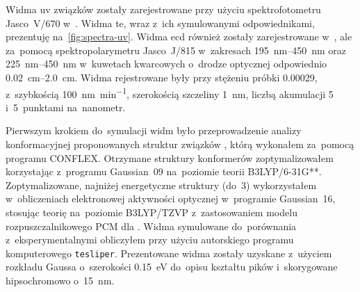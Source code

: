 Widma \gls{uv} związków  zostały zarejestrowane przy użyciu
  spektrofotometru Jasco~V\-/670 w~.
Widma te, wraz z~ich symulowanymi odpowiednikami, prezentuję na~\cref{fig:spectra-uv}.
Widma \gls{ecd} również zostały zarejestrowane w~, ale za~pomocą spektropolarymetru
  Jasco~J\-/815 w~zakresach \SIrange{195}{450}{\nano\meter} oraz \SIrange{225}{450}{\nano\meter}
  w~kuwetach kwarcowych o~drodze optycznej odpowiednio \SIrange{0.02}{2.0}{\centi\meter}.
Widma rejestrowane były przy stężeniu próbki \SI{0.00029}{\molar},
  z~szybkością \SI{100}{\nm\per\minute}, szerokością szczeliny \SI{1}{\nm}, liczbą akumulacji 5
  i~5~punktami na~nanometr.

Pierwszym krokiem do~symulacji widm było przeprowadzenie analizy konformacyjnej
  proponowanych struktur związków , którą wykonałem
  za~pomocą programu CONFLEX.
Otrzymane struktury konformerów zoptymalizowałem korzystając z~programu
  Gaussian~09 na~poziomie teorii B3LYP/6-31G**.
Zoptymalizowane, najniżej energetyczne struktury (do~\SI{3}{\kcalpm}) wykorzystałem w~obliczeniach
  elektronowej aktywności optycznej w~programie Gaussian~16, stosując teorię
  na~poziomie B3LYP/TZVP z~zastosowaniem modelu rozpuszczalnikowego PCM dla .
Widma symulowane do~porównania z~eksperymentalnymi obliczyłem przy użyciu autorskiego
  programu komputerowego \texttt{tesliper}.
Prezentowane widma zostały uzyskane z~użyciem rozkładu Gaussa o~szerokości \SI{0.15}{\electronvolt}
  do~opisu kształtu pików i~skorygowane hipsochromowo o~\SI{15}{\nano\meter}.

